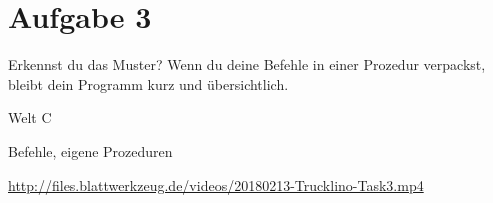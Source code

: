 \pagebreak

\section*{Aufgabe 3}
\label{sec:exercises:3}

Erkennst du das Muster? Wenn du deine Befehle in einer Prozedur verpackst, bleibt dein Programm kurz und übersichtlich.

\begin{description}[noitemsep]
  \item[Welt wählen:] Welt C
  \item[Du brauchst:] Befehle, eigene Prozeduren
  \item[Video:] \url{http://files.blattwerkzeug.de/videos/20180213-Trucklino-Task3.mp4}
\end{description}

